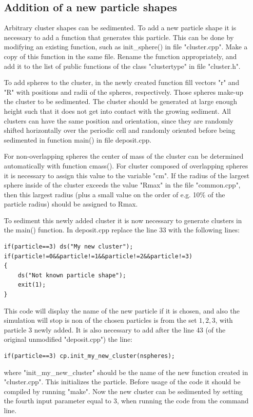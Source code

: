 \documentclass[12pt]{article}
\begin{document}
\subsection{Addition of a new particle shapes}

Arbitrary cluster shapes can be sedimented. To add a new particle shape it is necessary to add a function that generates this particle. This can be done by modifying an existing function, such as init\_sphere() in file "cluster.cpp". Make a copy of this function in the same file. Rename the function appropriately, and add it to the list of public functions of the class "clustertype" in file "cluster.h".

To add spheres to the cluster, in the newly created function fill vectors "r" and "R" with positions and radii of the spheres, respectively. Those spheres make-up the cluster to be sedimented. The cluster should be generated at large enough height such that it does not get into contact with the growing sediment. All clusters can have the same position and orientation, since they are randomly shifted horizontally over the periodic cell and randomly oriented before being sedimented in function main() in file deposit.cpp.  

For non-overlapping spheres the center of mass of the cluster can be determined automatically with function cmass(). For cluster composed of overlapping spheres it is necessary to assign this value to the variable "cm".
If the radius of the largest sphere inside of the cluster exceeds the value "Rmax" in the file "common.cpp", then this largest radius  (plus a small value on the order of e.g. 10\% of the particle radius) should be assigned to Rmax.

To sediment this newly added cluster it is now necessary to generate clusters in the main() function. In deposit.cpp replace the line 33 with the following lines:

\begin{verbatim}
if(particle==3) ds("My new cluster");
if(particle!=0&&particle!=1&&particle!=2&&particle!=3) 
{
	ds("Not known particle shape");
	exit(1);
}
\end{verbatim}
This code will display the name of the new particle if it is chosen, and also the simulation will stop is non of the chosen particles is from the set ${1,2,3}$, with particle 3 newly added. It is also necessary to add after the line 43 (of the original unmodified "deposit.cpp") the line:
\begin{verbatim}
if(particle==3)	cp.init_my_new_cluster(nspheres);
\end{verbatim}
where "init\_my\_new\_cluster" should be the name of the new function created in "cluster.cpp". This initializes the particle. Before usage of the code it should be compiled by running "make". Now the new cluster can be sedimented by setting the fourth input parameter equal to 3, when running the code from the command line.
\end{document}
